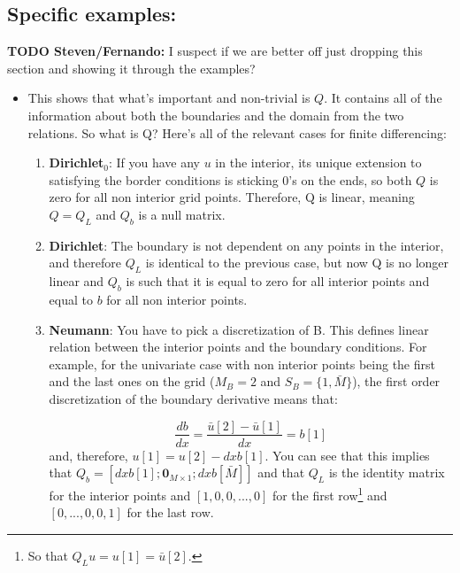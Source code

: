 \documentclass[11pt]{article}
\begin{document}
	\subsection{Specific examples:}
	\textbf{TODO Steven/Fernando:} I suspect if we are better off just dropping this section and showing it through the examples?
	\begin{itemize}
		\item This shows that what's important and non-trivial is $Q$. It contains all of the information about both the boundaries and the domain from the two relations. So what is Q? Here's all of the relevant cases for finite differencing:
		\begin{enumerate}
			\item \textbf{Dirichlet$_0$}: If you have any $u$ in the interior, its unique extension to satisfying the border conditions is sticking $0$'s on the ends, so both $Q$ is zero for all non interior grid points. Therefore, Q is linear, meaning $Q = Q_L$ and $Q_b$ is a null matrix.

			\item \textbf{Dirichlet}: The boundary is not dependent on any points in the interior, and therefore $Q_L$ is identical to the previous case, but now Q is no longer linear and
	 		$Q_b$ is such that it is equal to zero for all interior points and equal to $b$ for all non interior points.

			\item \textbf{Neumann}: You have to pick a discretization of B. This defines linear relation between the interior points and the boundary conditions. For example, for the univariate case with non interior points being the first and the last ones on the grid ($M_B = 2$ and $S_B = \{1,\bar{M}\}$), the first order discretization of the boundary derivative means that:

			\begin{equation}
				\frac{db}{dx} = \frac{\bar{u}[2] - \bar{u}[1]}{dx} = b[1]
			\end{equation}
			and, therefore, $u[1] = u[2] - dx b[1]$. You can see that this implies that $Q_b = [dx b[1];\mathbf{0}_{M \times 1};dx b[\bar{M}]]$ and that $Q_L$ is the identity matrix for the interior points and $[1,0, 0,...,0]$ for the first row\footnote{So that $Q_L u = u[1] = \bar{u}[2]$.} and $[0,...,0,0,1]$ for the last row.%

		\end{enumerate}
	\end{itemize}
\end{document}
